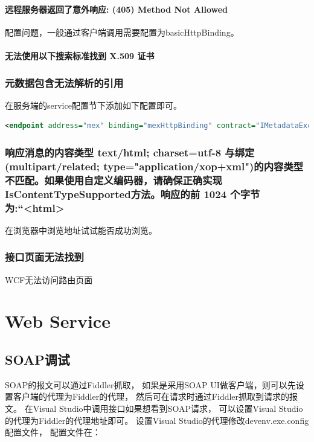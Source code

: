 \documentclass{book}
\begin{document}
\paragraph{远程服务器返回了意外响应: (405) Method Not Allowed}

配置问题，一般通过客户端调用需要配置为basicHttpBinding。

\paragraph{无法使用以下搜索标准找到 X.509 证书}

\subsubsection{元数据包含无法解析的引用}

在服务端的service配置节下添加如下配置即可。

\begin{lstlisting}[language=XML]
<endpoint address="mex" binding="mexHttpBinding" contract="IMetadataExchange" />
\end{lstlisting}

\subsubsection{响应消息的内容类型 text/html; charset=utf-8 与绑定(multipart/related; type="application/xop+xml")的内容类型不匹配。如果使用自定义编码器，请确保正确实现 IsContentTypeSupported方法。响应的前 1024 个字节为:“<html>}

在浏览器中浏览地址试试能否成功浏览。

\subsubsection{接口页面无法找到}

WCF无法访问路由页面

\section{Web Service}

\subsection{SOAP调试}

SOAP的报文可以通过Fiddler抓取，
如果是采用SOAP UI做客户端，则可以先设置客户端的代理为Fiddler的代理，
然后可在请求时通过Fiddler抓取到请求的报文。
在Visual Studio中调用接口如果想看到SOAP请求，
可以设置Visual Studio的代理为Fiddler的代理地址即可。
设置Visual Studio的代理修改devenv.exe.config配置文件，
配置文件在：
\end{document}
